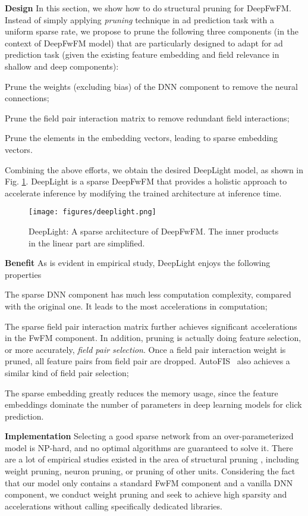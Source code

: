 \documentclass[sigconf]{acmart}
\begin{document}
{\bf Design} In this section, we show how to do structural pruning for DeepFwFM. Instead of simply applying \emph{pruning} technique in ad prediction task with a uniform sparse rate,  we propose to prune the following three components (in the context of DeepFwFM model) that are particularly designed to adapt for ad prediction task (given the existing feature embedding and field relevance in shallow and deep components): 

 Prune the weights (excluding bias) of the DNN component to remove the neural connections;

 Prune the field pair interaction matrix  to remove redundant field interactions;

 Prune the elements in the embedding vectors, leading to sparse embedding vectors.


Combining the above efforts, we obtain the desired DeepLight model, as shown in Fig. \ref{sparse_deepFwFM}. DeepLight is a sparse DeepFwFM that provides a holistic approach to accelerate inference by  modifying the trained architecture at inference time. 


\begin{figure}[h!]
\centering
  \texttt{[image: figures/deeplight.png]}
  \caption{DeepLight: A sparse architecture of DeepFwFM. The inner products in the linear part are simplified.}
  \label{sparse_deepFwFM}
\end{figure}

{\bf Benefit} As is evident in empirical study, DeepLight enjoys the following properties 





 The sparse DNN component has much less computation complexity, compared with the original one. It leads to the most accelerations in computation;

 The sparse field pair interaction matrix  further achieves significant accelerations in the FwFM component. In addition, pruning  is actually doing feature selection, or more accurately, \emph{field pair selection}. Once a field pair interaction weight  is pruned, all feature pairs from field pair  are dropped. AutoFIS~\cite{autofis} also achieves a similar kind of field pair selection;

 The sparse embedding greatly reduces the memory usage, since the feature embeddings dominate the number of parameters in deep learning models for click prediction.



{\bf Implementation} Selecting a good sparse network from an over-parameterized model is NP-hard, and no optimal algorithms are guaranteed to solve it. There are a lot of empirical studies existed in the area of structural pruning \cite{han2015learning, hansong16, frankle2018lottery, deng2019}, including weight pruning, neuron pruning, or pruning of other units. Considering the fact that our model only contains a standard FwFM component and a vanilla DNN component, we conduct weight pruning and seek to achieve high sparsity and accelerations without calling specifically dedicated libraries. 
\end{document}
